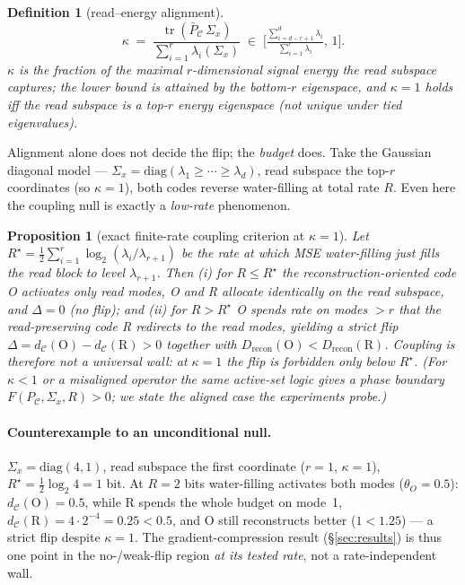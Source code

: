 \documentclass[11pt]{article}
\newtheorem{proposition}{Proposition}
\newtheorem{definition}{Definition}
\theoremstyle{remark}
\newcommand{\PC}{P_{\mathcal{C}}}
\newcommand{\PCbar}{\bar P_{\mathcal{C}}}
\newcommand{\Sx}{\Sigma_{x}}
\newcommand{\tr}{\operatorname{tr}}
\newcommand{\kalign}{\kappa}
\begin{document}
\begin{definition}[read--energy alignment]\label{def:kappa}
\begin{equation}
\kalign \;=\; \frac{\tr(\PCbar\,\Sx)}{\sum_{i=1}^{r}\lambda_i(\Sx)}
\;\in\;\Big[\tfrac{\sum_{i=d-r+1}^{d}\lambda_i}{\sum_{i=1}^{r}\lambda_i},\,1\Big].
\end{equation}
$\kalign$ is the fraction of the maximal $r$-dimensional signal energy the read subspace
captures; the lower bound is attained by the bottom-$r$ eigenspace, and $\kalign=1$ holds
iff the read subspace \emph{is} a top-$r$ energy eigenspace (not unique under tied
eigenvalues).
\end{definition}

\noindent Alignment alone does not decide the flip; the \emph{budget} does. Take the
Gaussian diagonal model --- $\Sx=\mathrm{diag}(\lambda_1\ge\cdots\ge\lambda_d)$, read
subspace the top-$r$ coordinates (so $\kalign=1$), both codes reverse water-filling at total
rate $R$. Even here the coupling null is exactly a \emph{low-rate} phenomenon.

\begin{proposition}[exact finite-rate coupling criterion at $\kalign=1$]\label{prop:kappa}
Let $R^\star=\tfrac12\sum_{i=1}^{r}\log_2(\lambda_i/\lambda_{r+1})$ be the rate at which MSE
water-filling just fills the read block to level $\lambda_{r+1}$. Then
\emph{(i)} for $R\le R^\star$ the reconstruction-oriented code O activates only read modes, O
and R allocate identically on the read subspace, and $\Delta=0$ (no flip); and
\emph{(ii)} for $R>R^\star$ O spends rate on modes $>r$ that the read-preserving code R
redirects to the read modes, yielding a strict flip
$\Delta=d_{\mathcal C}(\mathrm O)-d_{\mathcal C}(\mathrm R)>0$ together with
$D_{\mathrm{recon}}(\mathrm O)<D_{\mathrm{recon}}(\mathrm R)$. Coupling is therefore
\emph{not} a universal wall: at $\kalign=1$ the flip is forbidden only below $R^\star$. (For
$\kalign<1$ or a misaligned operator the same active-set logic gives a phase boundary
$F(\PC,\Sx,R)>0$; we state the aligned case the experiments probe.)
\end{proposition}

\paragraph{Counterexample to an unconditional null.} $\Sx=\mathrm{diag}(4,1)$, read subspace
the first coordinate ($r{=}1$, $\kalign{=}1$), $R^\star=\tfrac12\log_2 4=1$ bit. At $R=2$
bits water-filling activates both modes ($\theta_O{=}0.5$): $d_{\mathcal C}(\mathrm O)=0.5$,
while R spends the whole budget on mode~1, $d_{\mathcal C}(\mathrm R)=4\cdot2^{-4}=0.25<0.5$,
and O still reconstructs better ($1<1.25$) --- a strict flip despite $\kalign=1$. The
gradient-compression result (\S\ref{sec:results}) is thus one point in the no-/weak-flip
region \emph{at its tested rate}, not a rate-independent wall.
\end{document}
